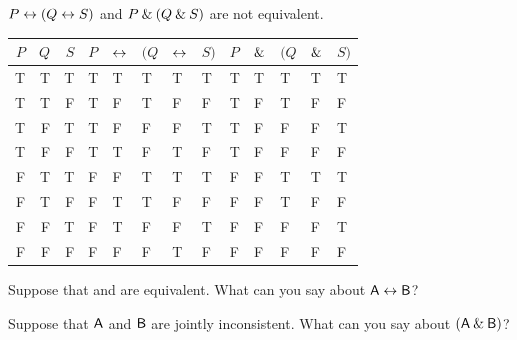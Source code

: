 \begin{small}
\begin{earg}
\begin{minipage}{10cm}
\item $P \leftrightarrow (Q \leftrightarrow S)$ and $P \mathbin{\&} (Q \mathbin{\&} S)$ are not equivalent.
\begin{flushleft}
\begin{tabular}{d d d | f e e e h | f e e e e}
$P$ & $Q$ & $S$ & $P$ & $\leftrightarrow$ & $(Q$ & $\leftrightarrow$ & $S)$ & $P$ & $\mathbin{\&}$ & $(Q$ & $\mathbin{\&}$ & $S)$\\
\hline
T & T & T &    T & T &    T & T &  T &       T & T &   T & T & T\Tstrut\\
T & T & F &    T & F &    T & F &  F &        T & F &   T & F & F\\
T & F & T &    T & F &    F & F &  T &        T & F &   F & F & T\\
T & F & F &    T & T &    F & T &  F &        T & F &   F & F & F\\\hline
F & T & T &    F & F &    T & T &  T &        F & F &   T & T & T\Tstrut\\
F & T & F &    F & T &    T & F &  F &        F & F &   T & F & F\\
F & F & T &    F & T &    F & F &  T &        F & F &   F & F & T\\
F & F & F &    F & F &    F & T &  F &        F & F &   F & F & F
\end{tabular}
\end{flushleft}\medskip
\end{minipage}

\end{earg}


\problempart
\label{pr.TT.concepts}
\begin{earg}
\item Suppose that  and  are equivalent. What can you say about $\mathsf{A}\leftrightarrow\mathsf{B}$?
\begin{ebullet}
\item[] 
\end{ebullet}

\item Suppose that $\mathsf{A}$ and $\mathsf{B}$ are jointly inconsistent. What can you say about $(\mathsf{A}\mathbin{\&}\mathsf{B})$?
\begin{ebullet}
\item[] 
\end{ebullet}


\end{earg}
\end{small}
